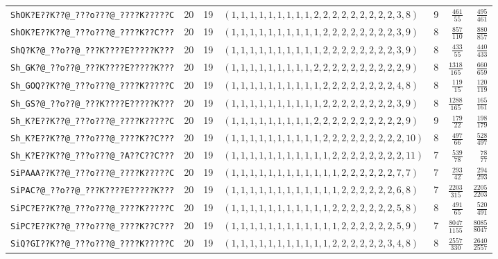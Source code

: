 \documentclass[paper=a4,fontsize=10.5pt,jafontsize=10.5pt]{jlreq}
\theoremstyle{plain}
\theoremstyle{definition}
\begin{document}
\begin{table}[htbp]
\begin{tabular}{llrlrrr}
\texttt{ShOK?E??K??@\_???o???@\_????K?????C} & 20 & 19 & $(1,1,1,1,1,1,1,1,1,2,2,2,2,2,2,2,2,2,3,8)$ & 9 & $\frac{461}{55}$ & $\frac{495}{461}$ \\
\texttt{ShOK?E??K??@\_???o???@\_????K??C???} & 20 & 19 & $(1,1,1,1,1,1,1,1,1,1,2,2,2,2,2,2,2,2,3,9)$ & 8 & $\frac{857}{110}$ & $\frac{880}{857}$ \\
\texttt{ShQ?K?@\_??o??@\_???K????E?????K???} & 20 & 19 & $(1,1,1,1,1,1,1,1,1,1,2,2,2,2,2,2,2,2,3,9)$ & 8 & $\frac{433}{55}$ & $\frac{440}{433}$ \\
\texttt{Sh\_GK?@\_??o??@\_???K????E?????K???} & 20 & 19 & $(1,1,1,1,1,1,1,1,1,2,2,2,2,2,2,2,2,2,2,9)$ & 8 & $\frac{1318}{165}$ & $\frac{660}{659}$ \\
\texttt{Sh\_GOQ??K??@\_???o???@\_????K?????C} & 20 & 19 & $(1,1,1,1,1,1,1,1,1,1,2,2,2,2,2,2,2,2,4,8)$ & 8 & $\frac{119}{15}$ & $\frac{120}{119}$ \\
\texttt{Sh\_GS?@\_??o??@\_???K????E?????K???} & 20 & 19 & $(1,1,1,1,1,1,1,1,1,1,2,2,2,2,2,2,2,2,3,9)$ & 8 & $\frac{1288}{165}$ & $\frac{165}{161}$ \\
\texttt{Sh\_K?E??K??@\_???o???@\_????K?????C} & 20 & 19 & $(1,1,1,1,1,1,1,1,1,2,2,2,2,2,2,2,2,2,2,9)$ & 9 & $\frac{179}{22}$ & $\frac{198}{179}$ \\
\texttt{Sh\_K?E??K??@\_???o???@\_????K??C???} & 20 & 19 & $(1,1,1,1,1,1,1,1,1,1,2,2,2,2,2,2,2,2,2,10)$ & 8 & $\frac{497}{66}$ & $\frac{528}{497}$ \\
\texttt{Sh\_K?E??K??@\_???o???@\_?A??C??C???} & 20 & 19 & $(1,1,1,1,1,1,1,1,1,1,1,2,2,2,2,2,2,2,2,11)$ & 7 & $\frac{539}{78}$ & $\frac{78}{77}$ \\
\texttt{SiPAAA??K??@\_???o???@\_????K?????C} & 20 & 19 & $(1,1,1,1,1,1,1,1,1,1,1,1,2,2,2,2,2,2,7,7)$ & 7 & $\frac{293}{42}$ & $\frac{294}{293}$ \\
\texttt{SiPAC?@\_??o??@\_???K????E?????K???} & 20 & 19 & $(1,1,1,1,1,1,1,1,1,1,1,1,2,2,2,2,2,2,6,8)$ & 7 & $\frac{2203}{315}$ & $\frac{2205}{2203}$ \\
\texttt{SiPC?E??K??@\_???o???@\_????K?????C} & 20 & 19 & $(1,1,1,1,1,1,1,1,1,1,1,2,2,2,2,2,2,2,5,8)$ & 8 & $\frac{491}{65}$ & $\frac{520}{491}$ \\
\texttt{SiPC?E??K??@\_???o???@\_????K??C???} & 20 & 19 & $(1,1,1,1,1,1,1,1,1,1,1,1,2,2,2,2,2,2,5,9)$ & 7 & $\frac{8047}{1155}$ & $\frac{8085}{8047}$ \\
\texttt{SiQ?GI??K??@\_???o???@\_????K?????C} & 20 & 19 & $(1,1,1,1,1,1,1,1,1,1,1,2,2,2,2,2,2,3,4,8)$ & 8 & $\frac{2557}{330}$ & $\frac{2640}{2557}$ \\

\end{tabular}
\end{table}
\end{document}
